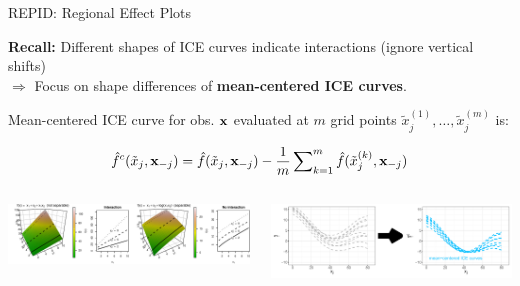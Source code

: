 \documentclass[11pt,compress,t,notes=noshow, aspectratio=169, xcolor=table,dvipsnames]{beamer}
\begin{document}



\begin{frame}{REPID: Regional Effect Plots }

\textbf{Recall:} Different shapes of ICE curves indicate interactions (ignore vertical shifts)\\
$\Rightarrow$ Focus on shape differences of {\color{cice}\bfseries mean-centered ICE curves}.
    

Mean-centered ICE curve for obs. $\mathbf{x}$ evaluated at $m$ grid points $\tilde x_j^{(1)}, \dots, \tilde x_j^{(m)}$ is:

{\color{cice}
$$\hat f^c(\tilde x_j, \mathbf{x}_{-j}) = \hat{f}(\tilde x_j, \mathbf{x}_{-j}) - \frac{1}{m} \sum\nolimits_{k=1}^m \hat{f}(\tilde x_j^{(k)}, \mathbf{x}_{-j})$$}

\begin{columns}
    \begin{column}{0.39\textwidth}
        \includegraphics[width = \textwidth, trim={13cm 0cm 0cm 0cm}, clip]{figure/interaction_separable_2}
    \end{column}
    \begin{column}{0.61\textwidth}
        \includegraphics[width = \textwidth]{figure/ice_rep_distance0.png} 
    \end{column}
\end{columns}

\end{frame}
\end{document}
